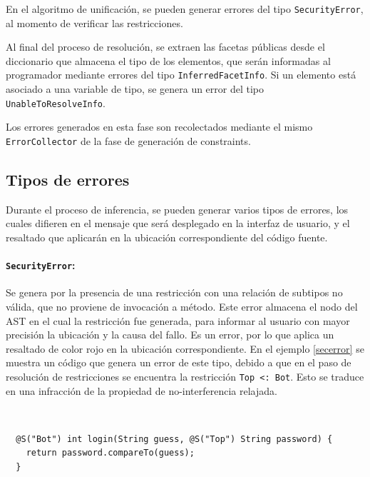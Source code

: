 En el algoritmo de unificación, se pueden generar errores del tipo \texttt{SecurityError}, al momento de verificar las restricciones.

Al final del proceso de resolución, se extraen las facetas públicas desde el diccionario que almacena el tipo de los elementos, que serán informadas al programador mediante errores del tipo \texttt{InferredFacetInfo}. Si un elemento está asociado a una variable de tipo, se genera un error del tipo \texttt{UnableToResolveInfo}.

Los errores generados en esta fase son recolectados mediante el mismo \texttt{ErrorCollector} de la fase de generación de constraints.


\subsection{Tipos de errores}
Durante el proceso de inferencia, se pueden generar varios tipos de errores, los cuales difieren en el mensaje que será desplegado en la interfaz de usuario, y el resaltado que aplicarán en la ubicación correspondiente del código fuente.

\paragraph{\texttt{SecurityError}:}Se genera por la presencia de una restricción con una relación de subtipos no válida, que no proviene de invocación a método. Este error almacena el nodo del AST en el cual la restricción fue generada, para informar al usuario con mayor precisión la ubicación y la causa del fallo. Es un error, por lo que aplica un resaltado de color rojo en la ubicación correspondiente. En el ejemplo \ref{secerror} se muestra un código que genera un error de este tipo, debido a que en el paso de resolución de restricciones se encuentra la restricción \texttt{Top <: Bot}. Esto se traduce en una infracción de la propiedad de no-interferencia relajada.

\begin{ej}\ \\
  \label{secerror}
  \normalfont
  \begin{lstlisting}
  @S("Bot") int login(String guess, @S("Top") String password) {
    return password.compareTo(guess);
  }
  \end{lstlisting}
\end{ej}

